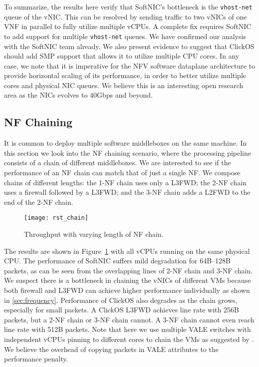 To summarize, the results here verify that SoftNIC's bottleneck is the {\tt vhost-net} queue of the vNIC. This can be resolved by sending traffic to two vNICs of one VNF in parallel to fully utilize multiple vCPUs. A complete fix requires SoftNIC to add support for multiple {\tt vhost-net} queues. We have confirmed our analysis with the SoftNIC team already. We also present evidence to suggest that ClickOS should add SMP support that allows it to utilize multiple CPU cores. In any case, we note that it is imperative for the NFV software dataplane architecture to provide horizontal scaling of its performance, in order to better utilize multiple cores and physical NIC queues. We believe this is an interesting open research area as the NICs evolves to 40Gbps and beyond.



\subsection{NF Chaining}
\label{sec:result_chain}

It is common to deploy multiple software middleboxes on the same machine. In this section we look into the NF chaining scenario, where the processing pipeline consists of a chain of different middleboxes. We are interested to see if the performance of an NF chain can match that of just a single NF. 
We compose chains of different lengths: the 1-NF chain uses only a L3FWD; the 2-NF chain uses a firewall followed by a L3FWD; and the 3-NF chain adds a L2FWD to the end of the 2-NF chain. 

\begin{figure}[ht]
\centering
    \vspace{-0.5mm}
    \texttt{[image: rst\_chain]}
    \caption{Throughput with varying length of NF chain.}
    \label{fig:rst_chain}
    \vspace{-2mm}
\end{figure}

The results are shown in Figure~\ref{fig:rst_chain} with all vCPUs running on the same physical CPU. The performance of SoftNIC suffers mild degradation for 64B--128B packets, as can be seen from the overlapping lines of 2-NF chain and 3-NF chain. We suspect there is a bottleneck in chaining the vNICs of different VMs because both firewall and L3FWD can achieve higher performance individually as shown in \cref{sec:frequency}.  
Performance of ClickOS also degrades as the chain grows, especially for small packets. 
A ClickOS L3FWD achieves line rate with 256B packets, but a 2-NF chain or 3-NF chain cannot. A 3-NF chain cannot even reach line rate with 512B packets. 
Note that here we use multiple VALE switches with independent vCPUs pinning to different cores to chain the VMs as suggested by \cite{MARO14}. We believe the overhead of copying packets in VALE attributes to the performance penalty.

